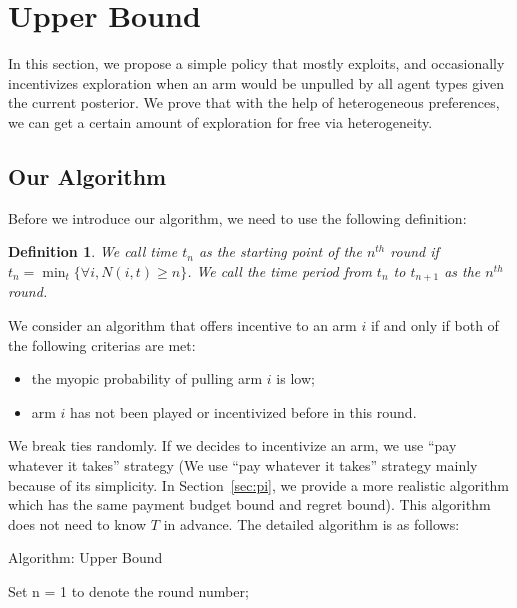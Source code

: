 \documentclass{article}
\newtheorem{definition}{Definition}[section]
\begin{document}
\section{Upper Bound}
\label{sec:ub}

In this section, we propose a simple policy that mostly exploits, and occasionally incentivizes exploration when an arm would be unpulled by all agent types given the current posterior. We prove that with the help of heterogeneous preferences, we can get a certain amount of exploration for free via heterogeneity. 

\subsection{Our Algorithm}
Before we introduce our algorithm, we need to use the following definition:

\begin{definition}
We call time $t_{n}$ as the starting point of the $n^{th}$ round if $t_{n}=\min_{t}\{\forall i, N(i,t)\geq n\}$. We call the time period from $t_{n}$ to $t_{n+1}$ as the $n^{th}$ round.
\end{definition}

We consider an algorithm that offers incentive to an arm $i$ if and only if both of the following criterias are met:
\begin{itemize}
\item the myopic probability of pulling arm $i$ is low; 
\item arm $i$ has not been played or incentivized before in this round.
\end{itemize}
We break ties randomly. If we decides to incentivize an arm, we use ``pay whatever it takes'' strategy (We use ``pay whatever it takes'' strategy mainly because of its simplicity. In Section~\ref{sec:pi}, we provide a more realistic algorithm which has the same payment budget bound and regret bound). This algorithm does not need to know $T$ in advance. The detailed algorithm is as follows:

\begin{algorithm}
\caption{Algorithm: Upper Bound}
\label{Alg1}
\begin{algorithmic}
\STATE Set n = 1 to denote the round number;
\ENDFOR

\end{algorithmic}
\end{algorithm}
\end{document}
